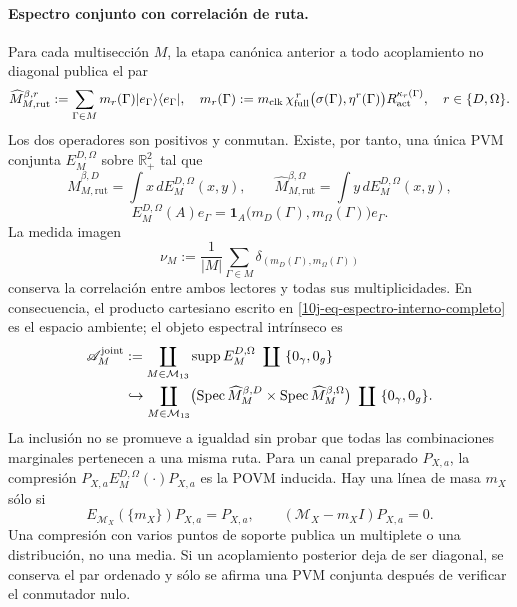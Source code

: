 \paragraph{Espectro conjunto con correlación de ruta.}
Para cada multisección \(M\), la etapa canónica anterior a todo acoplamiento
no diagonal publica el par
\begin{equation}
 \widehat M_{M,\mathrm{rut}}^{\beta,r}
 :=\sum_{\Gamma\in M}m_r(\Gamma)
 |e_\Gamma\rangle\langle e_\Gamma|,
 \quad
 m_r(\Gamma):=m_{\rm clk}\,
 \chi_{\rm full}^{\,r}\bigl(\sigma(\Gamma),\eta^r(\Gamma)\bigr)
 R_{\rm act}^{\kappa_r(\Gamma)},
 \quad r\in\{D,\Omega\}.
 \label{10j-eq-par-diagonal-ruta}
\end{equation}
Los dos operadores son positivos y conmutan. Existe, por tanto, una única PVM
conjunta \(E_M^{D,\Omega}\) sobre \(\mathbb R_+^2\) tal que
\begin{equation}
 \widehat M_{M,\mathrm{rut}}^{\beta,D}=\int x\,dE_M^{D,\Omega}(x,y),
 \qquad
 \widehat M_{M,\mathrm{rut}}^{\beta,\Omega}=\int y\,dE_M^{D,\Omega}(x,y),
 \label{10j-eq-pvm-conjunta}
\end{equation}
\begin{equation}
 E_M^{D,\Omega}(A)e_\Gamma
 =\mathbf 1_A\!\bigl(m_D(\Gamma),m_\Omega(\Gamma)\bigr)e_\Gamma.
 \label{10j-eq-pvm-accion-ruta}
\end{equation}
La medida imagen
\begin{equation}
 \nu_M:=\frac1{|M|}\sum_{\Gamma\in M}
 \delta_{(m_D(\Gamma),m_\Omega(\Gamma))}
 \label{10j-eq-medida-imagen-conjunta}
\end{equation}
conserva la correlación entre ambos lectores y todas sus multiplicidades. En
consecuencia, el producto cartesiano escrito en
\eqref{10j-eq-espectro-interno-completo} es el espacio ambiente; el objeto
espectral intrínseco es
\begin{equation}
 \begin{aligned}
 \mathscr A_M^{\rm joint}
 &:=
 \coprod_{M\in\mathcal M_{13}}\operatorname{supp}E_M^{D,\Omega}
 \ \coprod\ \{0_\gamma,0_g\}\\
 &\hookrightarrow
 \coprod_{M\in\mathcal M_{13}}
 \bigl(\operatorname{Spec}\widehat M_M^{\beta,D}
 \times\operatorname{Spec}\widehat M_M^{\beta,\Omega}\bigr)
 \ \coprod\ \{0_\gamma,0_g\}.
 \end{aligned}
 \label{10j-eq-espectro-conjunto-completo}
\end{equation}
La inclusión no se promueve a igualdad sin probar que todas las combinaciones
marginales pertenecen a una misma ruta. Para un canal preparado \(P_{X,a}\),
la compresión \(P_{X,a}E_M^{D,\Omega}(\cdot)P_{X,a}\) es la POVM inducida.
Hay una línea de masa \(m_X\) sólo si
\begin{equation}
 E_{\mathcal M_X}(\{m_X\})P_{X,a}=P_{X,a},
 \qquad
 (\mathcal M_X-m_XI)P_{X,a}=0.
 \label{10j-eq-criterio-linea-espectral}
\end{equation}
Una compresión con varios puntos de soporte publica un multiplete o una
distribución, no una media. Si un acoplamiento posterior deja de ser diagonal,
se conserva el par ordenado y sólo se afirma una PVM conjunta después de
verificar el conmutador nulo.

